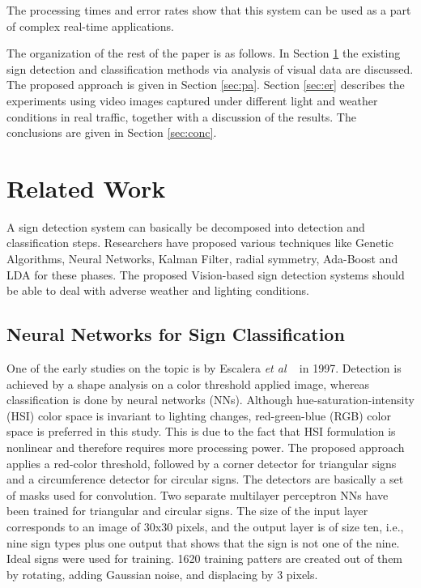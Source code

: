 \documentclass[review,number]{elsarticle}
\begin{document}
The processing times and error rates show that this system can be used as a part of complex real-time applications.

The organization of the rest of the paper is as follows. In Section \ref{sec:literature} the existing sign detection and classification methods via analysis of visual data are discussed. The proposed approach is given in Section \ref{sec:pa}. Section \ref{sec:er} describes the experiments using video images captured under different light and weather conditions in real traffic, together with a discussion of the results. The conclusions are given in Section \ref{sec:conc}.

\section{Related Work}
\label{sec:literature}

A sign detection system can basically be decomposed into detection and classification steps. Researchers have proposed various techniques like Genetic Algorithms, Neural Networks, Kalman Filter, radial symmetry, Ada-Boost and LDA for these phases. The proposed Vision-based sign detection systems should be able to deal with adverse weather and lighting conditions.

\subsection{Neural Networks for Sign Classification}
One of the early studies on the topic is by Escalera \textit{et al} ~\cite{signbib02} in 1997. Detection is achieved by a shape analysis on a color threshold applied image, whereas classification is done by neural networks (NNs). Although hue-saturation-intensity (HSI) color space is invariant to lighting changes, red-green-blue (RGB) color space is preferred in this study. This is due to the fact that HSI formulation is nonlinear and therefore requires more processing power. The proposed approach applies a red-color threshold, followed by a corner detector for triangular signs and a circumference detector for circular signs. The detectors are basically a set of masks used for convolution. Two separate multilayer perceptron NNs have been trained for triangular and circular signs. The size of the input layer corresponds to an image of 30x30 pixels, and the output layer is of size ten, i.e., nine sign types plus one output that shows that the sign is not one of the nine. Ideal signs were used for training. 1620 training patters are created out of them by rotating, adding Gaussian noise, and displacing by 3 pixels.
\end{document}
